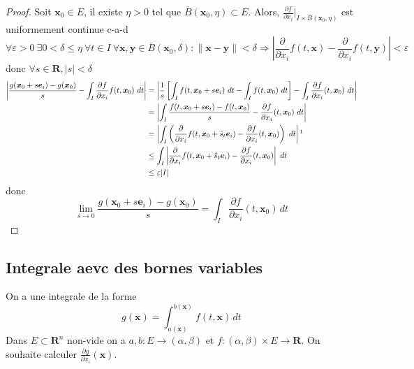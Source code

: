 \begin{proof}
Soit $\boldsymbol{x}_{0}\in E$, il existe $\eta>0$ tel que $\overline{B}(\boldsymbol{x}_{0},\eta)\subset E$. Alors, $\frac{ \partial f }{ \partial x_{i} }\rvert_{I\times \overline{B}(\boldsymbol{x}_{0},\eta)}$ est uniformement continue c-a-d
$$
\forall\varepsilon>0~\exists 0<\delta\le \eta~\forall t\in I~\forall \boldsymbol{x},\boldsymbol{y}\in \overline{B}(\boldsymbol{x}_{0},\delta):\lVert \boldsymbol{x}-\boldsymbol{y} \rVert<\delta \Rightarrow |\frac{ \partial  }{ \partial x_{i} } f(t,\boldsymbol{x})-\frac{ \partial  }{ \partial x_{i} } f(t,\boldsymbol{y})|<\varepsilon 
$$
donc $\forall s \in \mathbf{R},|s|<\delta$
\begin{align*}
\left\lvert  \frac{g(\boldsymbol{x}_{0}+s\boldsymbol{e}_{i})-g(\boldsymbol{x}_{0})}{s}-\int _{I}\frac{ \partial f }{ \partial x_{i} } f(t,\boldsymbol{x}_{0})~dt  \right\rvert  & = \left\lvert  \frac{1}{s}\left[ \int _{I}f(t,\boldsymbol{x}_{0}+s\boldsymbol{e}_{i}) ~dt-\int _{I}f(t,\boldsymbol{x}_{0})~dt\right]-\int _{I}\frac{ \partial f }{ \partial x_{i} } (t,\boldsymbol{x}_{0})~dt \right\rvert  \\
 & =\left\lvert  \int _{I} \frac{f(t,\boldsymbol{x}_{0}+s\boldsymbol{e}_{i})-f(t,\boldsymbol{x}_{0})}{s} -\frac{ \partial f }{ \partial x_{i} }(t,\boldsymbol{x}_{0})~dt  \right\rvert \\
 & =\left\lvert  \int _{I} \left( \frac{ \partial  }{ \partial x_{i} } f(t,\boldsymbol{x}_{0}+\hat{s}_{t}\boldsymbol{e}_{i}) -\frac{ \partial f }{ \partial x_{i} } (t,\boldsymbol{x}_{0})\right) ~dt \right\rvert\footnotemark{}   \\
 & \le \int _{I}\left\lvert  \frac{ \partial  }{ \partial x_{i} } f(t,\boldsymbol{x}_{0}+\hat{s}_{t}\boldsymbol{e}_{i}) -\frac{ \partial f }{ \partial x_{i} } (t,\boldsymbol{x}_{0}) \right\rvert ~dt \\
 & \le \varepsilon |I|
\end{align*}
 donc 
$$
\lim_{ s \to 0 } \frac{g(\boldsymbol{x}_{0}+s\boldsymbol{e}_{i})-g(\boldsymbol{x}_{0})}{s}=\int _{I} \frac{ \partial f }{ \partial x_{i} } (t,\boldsymbol{x}_{0}) \, dt 
$$
\end{proof}


\subsection{Integrale aevc des bornes variables}

On a une integrale de la forme
$$
g(\boldsymbol{x})=\int_{a(\boldsymbol{x})}^{b(\boldsymbol{x})}f(t,\boldsymbol{x})  \, dt
$$
Dans $E\subset \mathbf{R}^{n}$ non-vide on a $a,b:E\to (\alpha,\beta)$ et $f:(\alpha,\beta)\times E\to \mathbf{R}$. On souhaite calculer $\frac{ \partial g }{ \partial x_{i} }(\boldsymbol{x})$.

